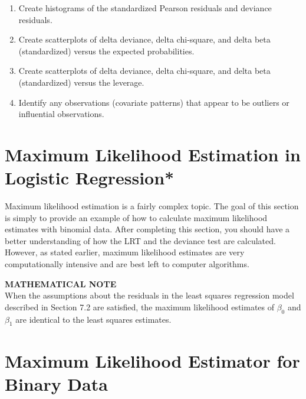\documentclass[
]{report}
\providecommand{\tightlist}{%
  \setlength{\itemsep}{0pt}\setlength{\parskip}{0pt}}
\begin{document}
\begin{enumerate}
\def\labelenumi{\alph{enumi}.}
\tightlist
\item
  Create histograms of the standardized Pearson residuals and deviance residuals.\\
\item
  Create scatterplots of delta deviance, delta chi‐square, and delta beta (standardized) versus the expected probabilities.\\
\item
  Create scatterplots of delta deviance, delta chi‐square, and delta beta (standardized) versus the leverage.\\
\item
  Identify any observations (covariate patterns) that appear to be outliers or influential observations.
\end{enumerate}

\hypertarget{maximum-likelihood-estimation-in-logistic-regression-1}{%
\section{\texorpdfstring{\textbf{Maximum Likelihood Estimation in Logistic Regression}*}{Maximum Likelihood Estimation in Logistic Regression*}}\label{maximum-likelihood-estimation-in-logistic-regression-1}}

Maximum likelihood estimation is a fairly complex topic. The goal of this section is simply to provide an example of how to calculate maximum likelihood estimates with binomial data. After completing this section, you should have a better understanding of how the LRT and the deviance test are calculated. However, as stated earlier, maximum likelihood estimates are very computationally intensive and are best left to computer algorithms.

\large

\textbf{MATHEMATICAL NOTE}\\
When the assumptions about the residuals in the least squares regression model described in Section 7.2 are satisfied, the maximum likelihood estimates of \(\beta_0\) and \(\beta_1\) are identical to the least squares estimates.\\
\normalsize

\hypertarget{maximum-likelihood-estimator-for-binary-data-1}{%
\section*{Maximum Likelihood Estimator for Binary Data}\label{maximum-likelihood-estimator-for-binary-data-1}}
\end{document}
